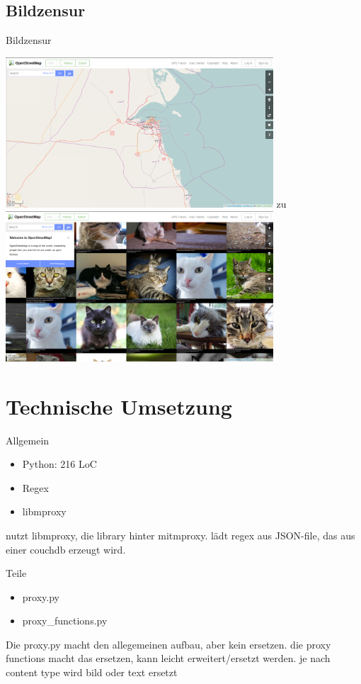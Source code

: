 \documentclass [xcolor=dvipsnames] {beamer}
\begin{document}
\subsection{Bildzensur}
\begin{frame}
	{\sc Bildzensur}
	\begin{center}
		{
			\includegraphics[width=10cm]{osm-1}
		}
		\only<2>
		{
			{\Large zu}
		}
		\only<3>
		{
			\includegraphics[width=10cm]{osm-mod-1}
		}
	\end{center}
\end{frame}

\section{Technische Umsetzung}
\begin{frame}
	{\sc Allgemein}
	\begin{itemize}
		\item Python: 216 LoC
		\item Regex
		\item libmproxy
	\end{itemize}
\end{frame}
\note
{
	{\Large nutzt libmproxy, die library hinter mitmproxy. lädt regex aus JSON-file, das aus einer couchdb erzeugt wird.}
	
}
\begin{frame}
	{\sc Teile}
	\begin{itemize}
		\item proxy.py
		\item proxy\_functions.py
	\end{itemize}
\end{frame}
\note
{
	{\Large Die proxy.py macht den allegemeinen aufbau, aber kein ersetzen. die proxy functions macht das ersetzen, kann leicht erweitert/ersetzt werden. je nach content type wird bild oder text ersetzt}
	
}
\end{document}
